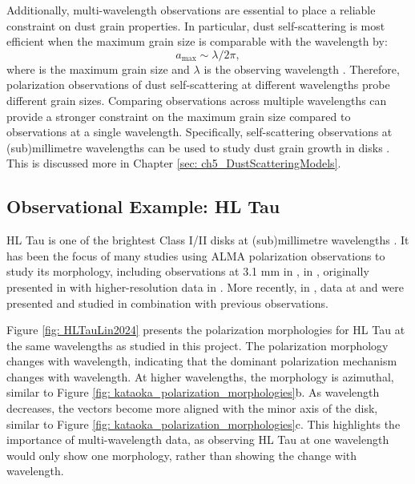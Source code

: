 Additionally, multi-wavelength observations are essential to place a reliable constraint on dust grain properties. In particular, dust self-scattering is most efficient when the maximum grain size is comparable with the wavelength by:
\begin{equation}
  a_{\text{max}} \sim \lambda / 2 \pi,
  \label{eq: scattering_efficiency}
\end{equation}
\noindent where \amax is the maximum grain size and $\lambda$ is the observing wavelength \citep{Kataoka_2015}. Therefore, polarization observations of dust self-scattering at different wavelengths probe different grain sizes. Comparing observations across multiple wavelengths can provide a stronger constraint on the maximum grain size compared to observations at a single wavelength. Specifically, self-scattering observations at (sub)millimetre wavelengths can be used to study dust grain growth in disks \citep{Kataoka_2015, Yang2016, Lin2021, Zhang2023}. This is discussed more in Chapter \ref{sec: ch5_DustScatteringModels}. 







\subsection{Observational Example: HL Tau}
\label{sec: intro_HL_Tau}

HL Tau is one of the brightest Class I/II disks at (sub)millimetre wavelengths \citep{Stephens_2017}. It has been the focus of many studies using ALMA polarization observations to study its morphology, including observations at 3.1 mm in \cite{Kataoka_2017}, \bsix in \cite{Stephens_2017}, \bseven originally presented in \cite{Stephens_2017} with higher-resolution data in \cite{Stephens2023}. More recently, in \cite{Lin2024}, data at \bfour and \bfive were presented and studied in combination with previous observations.

Figure \ref{fig: HLTauLin2024} presents the polarization morphologies for HL Tau at the same wavelengths as studied in this project. The polarization morphology changes with wavelength, indicating that the dominant polarization mechanism changes with wavelength. At higher wavelengths, the morphology is azimuthal, similar to Figure \ref{fig: kataoka_polarization_morphologies}b. As wavelength decreases, the vectors become more aligned with the minor axis of the disk, similar to Figure \ref{fig: kataoka_polarization_morphologies}c. This highlights the importance of multi-wavelength data, as observing HL Tau at one wavelength would only show one morphology, rather than showing the change with wavelength.

